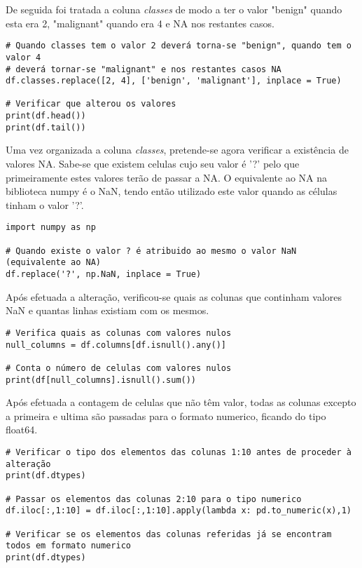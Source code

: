 \documentclass{article}
\begin{document}
De seguida foi tratada a coluna \textit{classes} de modo a ter o valor "benign" quando esta era 2, "malignant" quando era 4 e NA nos restantes casos.

\begin{lstlisting}
# Quando classes tem o valor 2 deverá torna-se "benign", quando tem o valor 4 
# deverá tornar-se "malignant" e nos restantes casos NA
df.classes.replace([2, 4], ['benign', 'malignant'], inplace = True)

# Verificar que alterou os valores
print(df.head())
print(df.tail())
\end{lstlisting}

Uma vez organizada a coluna \textit{classes}, pretende-se agora verificar a exist\^encia de valores NA. Sabe-se que existem celulas cujo seu valor \'e '?' pelo que primeiramente estes valores ter\~ao de passar a NA. O equivalente ao NA na biblioteca numpy \'e o NaN, tendo ent\~ao utilizado este valor quando as c\'elulas tinham o valor '?'.

\begin{lstlisting}
import numpy as np

# Quando existe o valor ? é atribuido ao mesmo o valor NaN (equivalente ao NA)
df.replace('?', np.NaN, inplace = True)
\end{lstlisting}

Ap\'os efetuada a altera\c c\~ao, verificou-se quais as colunas que continham valores NaN e quantas linhas existiam com os mesmos.

\begin{lstlisting}
# Verifica quais as colunas com valores nulos
null_columns = df.columns[df.isnull().any()]

# Conta o número de celulas com valores nulos
print(df[null_columns].isnull().sum())
\end{lstlisting}

Ap\'os efetuada a contagem de celulas que n\~ao t\^em valor, todas as colunas excepto a primeira e ultima s\~ao passadas para o formato numerico, ficando do tipo float64.

\begin{lstlisting}
# Verificar o tipo dos elementos das colunas 1:10 antes de proceder à alteração
print(df.dtypes)

# Passar os elementos das colunas 2:10 para o tipo numerico
df.iloc[:,1:10] = df.iloc[:,1:10].apply(lambda x: pd.to_numeric(x),1)

# Verificar se os elementos das colunas referidas já se encontram todos em formato numerico
print(df.dtypes)
\end{lstlisting}
\end{document}

